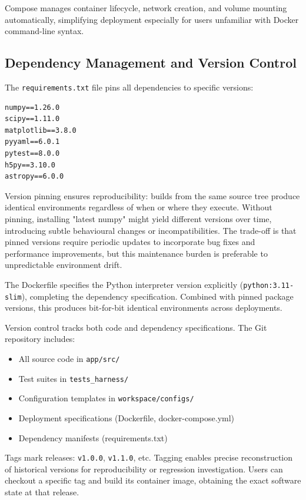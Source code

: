 Compose manages container lifecycle, network creation, and volume mounting automatically, simplifying deployment especially for users unfamiliar with Docker command-line syntax.

\subsection{Dependency Management and Version Control}

The \texttt{requirements.txt} file pins all dependencies to specific versions:

\begin{verbatim}
numpy==1.26.0
scipy==1.11.0
matplotlib==3.8.0
pyyaml==6.0.1
pytest==8.0.0
h5py==3.10.0
astropy==6.0.0
\end{verbatim}

Version pinning ensures reproducibility: builds from the same source tree produce identical environments regardless of when or where they execute. Without pinning, installing "latest numpy" might yield different versions over time, introducing subtle behavioural changes or incompatibilities. The trade-off is that pinned versions require periodic updates to incorporate bug fixes and performance improvements, but this maintenance burden is preferable to unpredictable environment drift.

The Dockerfile specifies the Python interpreter version explicitly (\texttt{python:3.11-slim}), completing the dependency specification. Combined with pinned package versions, this produces bit-for-bit identical environments across deployments.

Version control tracks both code and dependency specifications. The Git repository includes:

\begin{itemize}
    \item All source code in \texttt{app/src/}
    \item Test suites in \texttt{tests\_harness/}
    \item Configuration templates in \texttt{workspace/configs/}
    \item Deployment specifications (Dockerfile, docker-compose.yml)
    \item Dependency manifests (requirements.txt)
\end{itemize}

Tags mark releases: \texttt{v1.0.0}, \texttt{v1.1.0}, etc. Tagging enables precise reconstruction of historical versions for reproducibility or regression investigation. Users can checkout a specific tag and build its container image, obtaining the exact software state at that release.

